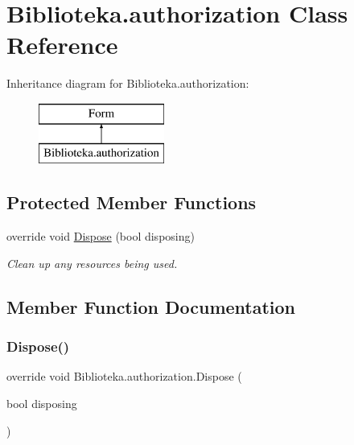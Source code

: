 \hypertarget{class_biblioteka_1_1authorization}{}\section{Biblioteka.\+authorization Class Reference}
\label{class_biblioteka_1_1authorization}
Inheritance diagram for Biblioteka.\+authorization\+:\begin{figure}[H]
\begin{center}
\leavevmode
\includegraphics[height=2.000000cm]{class_biblioteka_1_1authorization}
\end{center}
\end{figure}
\subsection*{Protected Member Functions}
\begin{DoxyCompactItemize}
\item 
override void \hyperlink{class_biblioteka_1_1authorization_a93c2ea374a360b091974a617f76f63ac}{Dispose} (bool disposing)
\begin{DoxyCompactList}\small\item\em Clean up any resources being used. \end{DoxyCompactList}\end{DoxyCompactItemize}


\subsection{Member Function Documentation}
\mbox{\label{class_biblioteka_1_1authorization_a93c2ea374a360b091974a617f76f63ac}} 
\subsubsection{\texorpdfstring{Dispose()}{Dispose()}}
{\footnotesize\ttfamily override void Biblioteka.\+authorization.\+Dispose (\begin{DoxyParamCaption}\item[{bool}]{disposing }\end{DoxyParamCaption})\hspace{0.3cm}{\ttfamily [protected]}}



